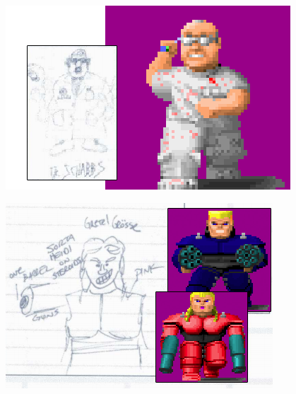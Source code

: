\documentclass[book.tex]{subfiles}
\begin{document}
     \begin{figure}[H]
\centering
     \includegraphics[width=\textwidth]{screenshots/sprites/tom_hall_sketch_dr_schabbs.png}
   \end{figure}
 
  \begin{figure}[H]
\centering
 \includegraphics[scale=0.8]{screenshots/sprites/tom_hall_sketch_gretel.png}\\
 \end{figure}
\end{document}
